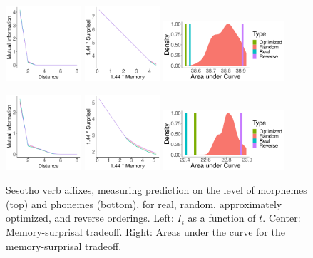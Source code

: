 \documentclass[11pt,letterpaper]{article}
\begin{document}
\begin{figure}
	\begin{center}
\includegraphics[width=0.25\textwidth]{figures/Sesotho-suffixes-byMorphemes-it-heldout.pdf}
\includegraphics[width=0.25\textwidth]{figures/Sesotho-suffixes-byMorphemes-memsurp-heldout.pdf}
\includegraphics[width=0.4\textwidth]{figures/Sesotho-suffixes-byMorphemes-auc-hist-heldout.pdf}

\includegraphics[width=0.25\textwidth]{figures/Sesotho-suffixes-byPhonemes-it-heldout.pdf}
\includegraphics[width=0.25\textwidth]{figures/Sesotho-suffixes-byPhonemes-memsurp-heldout.pdf}
\includegraphics[width=0.4\textwidth]{figures/Sesotho-suffixes-byPhonemes-auc-hist-heldout.pdf}
	\end{center}
	\caption{Sesotho verb affixes, measuring prediction on the level of morphemes (top) and phonemes (bottom), for real, random, approximately optimized, and reverse orderings. Left: $I_t$ as a function of $t$. Center: Memory-surprisal tradeoff. Right: Areas under the curve for the memory-surprisal tradeoff.}\label{fig:sesotho-morph}
\end{figure}
\end{document}
